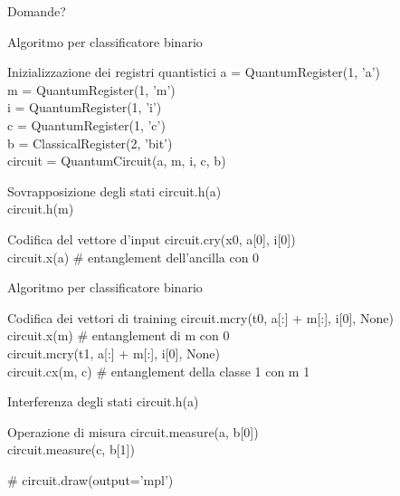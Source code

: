 \documentclass{beamer}
\begin{document}
    \begin{frame}[focus]
        Domande?
    \end{frame}

    \appendix

    \begin{frame}{Algoritmo per classificatore binario}
        \begin{block}{Inizializzazione dei registri quantistici}
            a = QuantumRegister(1, 'a') \\
            m = QuantumRegister(1, 'm') \\
            i = QuantumRegister(1, 'i') \\
            c = QuantumRegister(1, 'c') \\
            b = ClassicalRegister(2, 'bit') \\
            circuit = QuantumCircuit(a, m, i, c, b)
        \end{block}

        \begin{block}{Sovrapposizione degli stati}
            circuit.h(a) \\
            circuit.h(m)
        \end{block}

        \begin{block}{Codifica del vettore d'input}
            circuit.cry(x0, a[0], i[0]) \\
            circuit.x(a) \# entanglement dell'ancilla con 0
        \end{block}
    \end{frame}

    \begin{frame}{Algoritmo per classificatore binario}
        \begin{block}{Codifica dei vettori di training}
            circuit.mcry(t0, a[:] + m[:], i[0], None) \\
            circuit.x(m) \# entanglement di m con 0 \\
            circuit.mcry(t1, a[:] + m[:], i[0], None) \\
            circuit.cx(m, c) \# entanglement della classe 1 con m 1 \\
        \end{block}

        \begin{block}{Interferenza degli stati}
            circuit.h(a)
        \end{block}
        
        \begin{block}{Operazione di misura}
            circuit.measure(a, b[0]) \\
            circuit.measure(c, b[1]) \\
        \end{block}
        \# circuit.draw(output='mpl')
    \end{frame}
\end{document}
